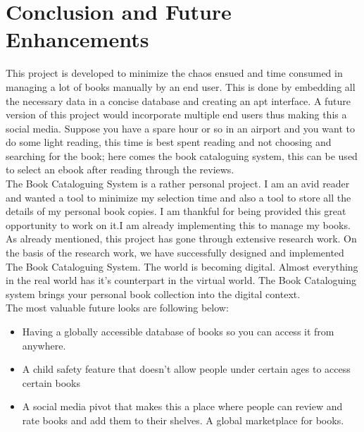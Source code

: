 \chapter{Conclusion and Future Enhancements}
This project is developed to minimize the chaos ensued and time consumed in managing a lot of books manually by an end user. This is done by embedding all the necessary data in a concise database and creating an apt interface. A future version of this project would incorporate multiple end users thus making this a social media. Suppose you have a spare hour or so in an airport and you want to do some light reading, this time is best spent reading and not choosing and searching for the book; here comes the book cataloguing system, this can be used to select an ebook after reading through the reviews. \\[0.2in]
The Book Cataloguing System is a rather personal project. I am an avid reader and wanted a tool to minimize my selection time and also a tool to store all the details of my personal book copies. I am thankful for being
provided this great opportunity to work on it.I am already implementing this to manage my books. As already mentioned, this project has gone through extensive research work. On the basis of the research work, we have successfully
designed and implemented The Book Cataloguing System. The world is becoming digital. Almost everything in the real world has it's counterpart in the virtual world. The Book Cataloguing system brings your personal book collection into the digital context.  \\[0.2in]

The most valuable future looks are following below:
\begin{itemize}

\item Having a globally accessible database of books so you can access it from anywhere.
\item A child safety feature that doesn't allow people under certain ages to access certain books
\item A social media pivot that makes this a place where people can review and rate books and add them to their shelves. A global marketplace for books.

\end{itemize}
